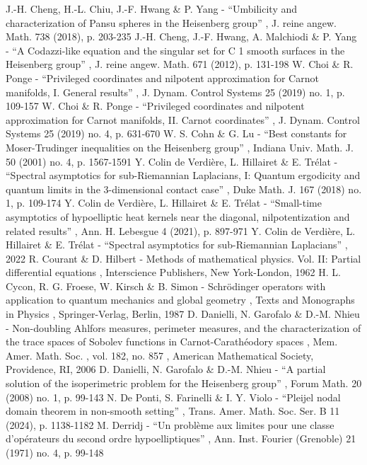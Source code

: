  J.-H. Cheng, H.-L. Chiu, J.-F. Hwang \& P. Yang - “Umbilicity and characterization of Pansu spheres in the Heisenberg group” , J. reine angew. Math. 738 (2018), p. 203-235
 J.-H. Cheng, J.-F. Hwang, A. Malchiodi \& P. Yang - “A Codazzi-like equation and the singular set for C 1 smooth surfaces in the Heisenberg group” , J. reine angew. Math. 671 (2012), p. 131-198
 W. Choi \& R. Ponge - “Privileged coordinates and nilpotent approximation for Carnot manifolds, I. General results” , J. Dynam. Control Systems 25 (2019) no. 1, p. 109-157
 W. Choi \& R. Ponge - “Privileged coordinates and nilpotent approximation for Carnot manifolds, II. Carnot coordinates” , J. Dynam. Control Systems 25 (2019) no. 4, p. 631-670
 W. S. Cohn \& G. Lu - “Best constants for Moser-Trudinger inequalities on the Heisenberg group” , Indiana Univ. Math. J. 50 (2001) no. 4, p. 1567-1591
 Y. Colin de Verdière, L. Hillairet \& E. Trélat - “Spectral asymptotics for sub-Riemannian Laplacians, I: Quantum ergodicity and quantum limits in the 3-dimensional contact case” , Duke Math. J. 167 (2018) no. 1, p. 109-174
 Y. Colin de Verdière, L. Hillairet \& E. Trélat - “Small-time asymptotics of hypoelliptic heat kernels near the diagonal, nilpotentization and related results” , Ann. H. Lebesgue 4 (2021), p. 897-971
 Y. Colin de Verdière, L. Hillairet \& E. Trélat - “Spectral asymptotics for sub-Riemannian Laplacians” , 2022
 R. Courant \& D. Hilbert - Methods of mathematical physics. Vol. II: Partial differential equations , Interscience Publishers, New York-London, 1962
 H. L. Cycon, R. G. Froese, W. Kirsch \& B. Simon - Schrödinger operators with application to quantum mechanics and global geometry , Texts and Monographs in Physics , Springer-Verlag, Berlin, 1987
 D. Danielli, N. Garofalo \& D.-M. Nhieu - Non-doubling Ahlfors measures, perimeter measures, and the characterization of the trace spaces of Sobolev functions in Carnot-Carathéodory spaces , Mem. Amer. Math. Soc. , vol. 182, no. 857 , American Mathematical Society, Providence, RI, 2006
 D. Danielli, N. Garofalo \& D.-M. Nhieu - “A partial solution of the isoperimetric problem for the Heisenberg group” , Forum Math. 20 (2008) no. 1, p. 99-143
 N. De Ponti, S. Farinelli \& I. Y. Violo - “Pleijel nodal domain theorem in non-smooth setting” , Trans. Amer. Math. Soc. Ser. B 11 (2024), p. 1138-1182
 M. Derridj - “Un problème aux limites pour une classe d’opérateurs du second ordre hypoelliptiques” , Ann. Inst. Fourier (Grenoble) 21 (1971) no. 4, p. 99-148
